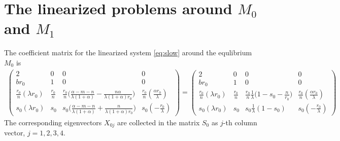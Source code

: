\documentclass[usletter,11pt]{article}
\theoremstyle{remark}
\begin{document}
\section{The linearized problems around $M_0$ and $M_1$}\label{append:lin}
The coefficient matrix for the linearized system \eqref{eq:slow} around the equlibrium $M_0$ is
\begin{align*}
 \begin{pmatrix}
          2 & 0 & 0 & 0 \\
          br_0 & 1 & 0 & 0\\
          \frac{r_0}{n}(\lambda r_0) & \frac{r_0}{n} & \frac{r_0}{n}\Big(\frac{\alpha-m-n}{\lambda(1+\alpha)} - \frac{n\alpha}{\lambda(1+\alpha)r_0}\Big) & \frac{r_0}{n}(\frac{\alpha r_0}{\lambda})\\
          s_0(\lambda r_0) & s_0 & s_0\Big(\frac{\alpha-m-n}{\lambda(1+\alpha)} + \frac{n}{\lambda(1+\alpha)r_0}\Big) & s_0(-\frac{r_0}{\lambda})
         \end{pmatrix}
        =\begin{pmatrix}
          2 & 0 & 0 & 0 \\
          br_0 & 1 & 0 & 0\\
          \frac{r_0}{n}(\lambda r_0) & \frac{r_0}{n} & \frac{r_0}{n}\frac{1}{\lambda}\Big(1-s_0-\frac{n}{r_0}\Big) & \frac{r_0}{n}(\frac{\alpha r_0}{\lambda})\\
          s_0(\lambda r_0) & s_0 & s_0\frac{1}{\lambda}(1-s_0) & s_0(-\frac{r_0}{\lambda})
         \end{pmatrix}
\end{align*}
The corresponding eigenvectors $X_{0j}$ are collected in the matrix $S_0$ as $j$-th column vector, $j=1,2,3,4$.
\end{document}
